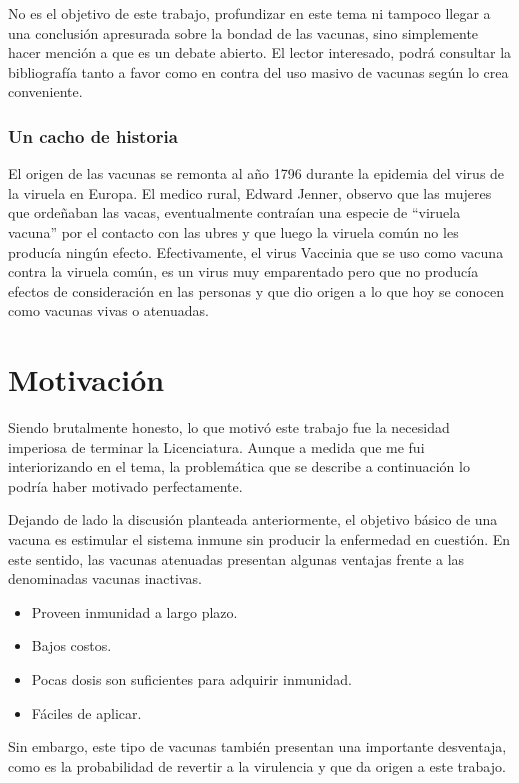 No es el objetivo de este trabajo, profundizar en este tema ni tampoco llegar
a una conclusi\'on apresurada sobre la bondad de las vacunas, sino simplemente
hacer menci\'on a que es un debate abierto. El lector interesado, podr\'a
consultar la bibliograf\'ia tanto a favor como en contra del uso
masivo de vacunas seg\'un lo crea conveniente.

\subsubsection{Un cacho de historia}

El origen de las vacunas se remonta al a\~no 1796 durante la epidemia del virus
de la viruela en Europa. El medico rural, Edward Jenner, observo que las
mujeres que orde\~naban las vacas, eventualmente contra\'ian una especie de
``viruela vacuna'' por el contacto con las ubres y que luego la viruela com\'un
no les produc\'ia ning\'un efecto. Efectivamente, el virus Vaccinia que se uso
como vacuna contra la viruela com\'un, es un virus muy emparentado pero que no
produc\'ia efectos de consideraci\'on en las personas y que dio origen a lo que
hoy se conocen como vacunas vivas o atenuadas.

\section{Motivaci\'on}
\label{motivacion}
Siendo brutalmente honesto, lo que motiv\'o este trabajo fue la necesidad
imperiosa de terminar la Licenciatura. Aunque a medida que me fui
interiorizando en el tema, la problem\'atica que se describe a continuaci\'on lo
podr\'ia haber motivado perfectamente.

Dejando de lado la discusi\'on planteada anteriormente, el objetivo b\'asico de
una vacuna es estimular el sistema inmune sin producir la enfermedad en
cuesti\'on. En este sentido, las vacunas atenuadas presentan algunas ventajas
frente a las denominadas vacunas inactivas.
\begin{itemize}
 \item Proveen inmunidad a largo plazo.
 \item Bajos costos.
 \item Pocas dosis son suficientes para adquirir inmunidad. 
 \item F\'aciles de aplicar.
\end{itemize}

Sin embargo, este tipo de vacunas tambi\'en presentan una importante desventaja,
como es la probabilidad de revertir a la virulencia y que da origen a este
trabajo.

